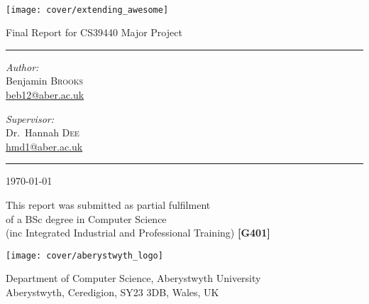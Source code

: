 \begin{titlepage}
	\begin{center}
	
	~\\
	
	\vspace{2cm}
	\texttt{[image: cover/extending\_awesome]} \\
	\vspace{2cm}
	
	{ \Large Final Report for CS39440 Major Project }
	\vspace{0.5cm}

	\hrule
	\vspace{0.25cm}
	\noindent
	\begin{minipage}[t]{0.4\textwidth}
		\begin{flushleft} \large
			\emph{Author:}\\
			Benjamin \textsc{Brooks}\\
			\href{mailto:beb12@aber.ac.uk}{beb12@aber.ac.uk}
		\end{flushleft}
	\end{minipage}%
	\begin{minipage}[t]{0.4\textwidth}
		\begin{flushright} \large
			\emph{Supervisor:} \\
			Dr.~Hannah \textsc{Dee}\\
			\href{mailto:hmd1@aber.ac.uk}{hmd1@aber.ac.uk}
		\end{flushright}
	\end{minipage}
	\vspace{0.5cm}
	\hrule
	\vspace{0.5cm}
	
	{ \Large \today }

	\vfill
	
	\vspace{1cm}
	This report was submitted as partial fulfilment \\
	of a BSc degree in Computer Science \\
	(inc Integrated Industrial and Professional Training) \textbf{[G401]}
	\vspace{1cm}
	
	\texttt{[image: cover/aberystwyth\_logo]}
	
	{ \footnotesize Department of Computer Science, Aberystwyth University } \\	
	{ \scriptsize Aberystwyth, Ceredigion, SY23 3DB, Wales, UK }
	
	\vspace{-3cm}

	\end{center}

	\ifpaper
		\newpage
		~
	\fi

\end{titlepage}
